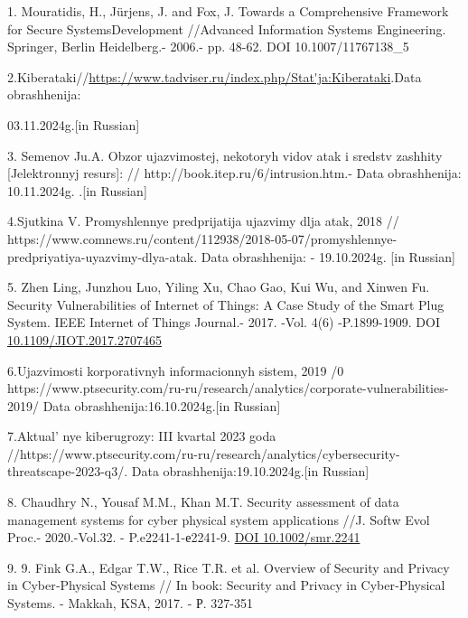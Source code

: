 \begin{references}
1. Mouratidis, H., Jürjens, J. and Fox, J. Towards a Comprehensive
Framework for Secure SystemsDevelopment //Advanced Information Systems
Engineering. Springer, Berlin Heidelberg.- 2006.- pp. 48-62. DOI
10.1007/11767138\_5

2.Kiberataki//\url{https://www.tadviser.ru/index.php/Stat'ja:Kiberataki}.Data
obrashhenija:

03.11.2024g.{[}in Russian{]}

3. Semenov Ju.A. Obzor ujazvimostej, nekotoryh vidov atak i sredstv
zashhity {[}Jelektronnyj resurs{]}: //
http://book.itep.ru/6/intrusion.htm.- Data obrashhenija: 10.11.2024g.
.{[}in Russian{]}

4.Sjutkina V. Promyshlennye predprijatija ujazvimy dlja atak, 2018 //
https://www.comnews.ru/content/112938/2018-05-07/promyshlennye-predpriyatiya-uyazvimy-dlya-atak.
Data obrashhenija: - 19.10.2024g. {[}in Russian{]}

5. Zhen Ling, Junzhou Luo, Yiling Xu, Chao Gao, Kui Wu, and Xinwen Fu.
Security Vulnerabilities of Internet of Things: A Case Study of the
Smart Plug System. IEEE Internet of Things Journal.- 2017. -Vol. 4(6)
-P.1899-1909. DOI
\href{https://doi.org/10.1109/JIOT.2017.2707465}{10.1109/JIOT.2017.2707465}

6.Ujazvimosti korporativnyh informacionnyh sistem, 2019 /0
https://www.ptsecurity.com/ru-ru/research/analytics/corporate-vulnerabilities-2019/
Data obrashhenija:16.10.2024g.{[}in Russian{]}

7.Aktual' nye kiberugrozy: III kvartal 2023 goda
//https://www.ptsecurity.com/ru-ru/research/analytics/cybersecurity-threatscape-2023-q3/.
Data obrashhenija:19.10.2024g.{[}in Russian{]}

8. Chaudhry N., Yousaf M.M., Khan M.T. Security assessment of data
management systems for cyber physical system applications //J. Softw
Evol Proc.- 2020.-Vol.32. - P.e2241-1-е2241-9.
\href{https://doi.org/10.1002/smr.2241}{DOI 10.1002/smr.2241}

9. 9. Fink G.A., Edgar T.W., Rice T.R. et al. Overview of Security and
Privacy in Cyber‐Physical Systems // In book: Security and Privacy in
Cyber‐Physical Systems. - Makkah, KSA, 2017. - Р. 327-351
\end{references}

